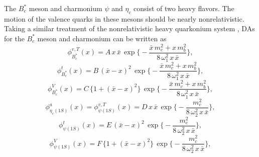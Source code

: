 \documentclass[preprint,superscriptaddress,nofootinbib]{revtex4}
\begin{document}
  The $B_{c}^{\ast}$ meson and charmonium ${\psi}$ and ${\eta}_{c}$
  consist of two heavy flavors.
  The motion of the valence quarks in these mesons should be nearly
  nonrelativistic.
  Taking a similar treatment of the nonrelativistic heavy quarkonium system
  \cite{plb751.171,plb752.322,ijmpa31.1650146,npb911.890},
  DAs for the $B_{c}^{\ast}$ meson and charmonium can be written as
   \begin{equation}
  {\phi}_{B_{c}^{\ast}}^{v,T}(x) = A\, x\,\bar{x}\,
  {\exp}\Big\{ -\frac{\bar{x}\,m_{c}^{2}+x\,m_{b}^{2}}
                     {8\,{\omega}_{1}^{2}\,x\,\bar{x}} \Big\}
   \label{da-bc-ev},
   \end{equation}
   \begin{equation}
  {\phi}_{B_{c}^{\ast}}^{t}(x) = B\, (\bar{x}-x)^{2}\,
  {\exp}\Big\{ -\frac{\bar{x}\,m_{c}^{2}+x\,m_{b}^{2}}
                     {8\,{\omega}_{1}^{2}\,x\,\bar{x}} \Big\}
   \label{da-bc-et},
   \end{equation}
   \begin{equation}
  {\phi}_{B_{c}^{\ast}}^{V}(x) = C\, \big\{ 1+(\bar{x}-x)^{2} \big\}\,
  {\exp}\Big\{ -\frac{\bar{x}\,m_{c}^{2}+x\,m_{b}^{2}}
                     {8\,{\omega}_{1}^{2}\,x\,\bar{x}} \Big\}
   \label{da-bc-tv},
   \end{equation}
   \begin{equation}
  {\phi}_{{\eta}_{c}(1S)}^{a}(x) =
  {\phi}_{{\psi}(1S)}^{v,T}(x) = D\, x\,\bar{x}\,
  {\exp}\Big\{ -\frac{ m_{c}^{2} }{ 8\,{\omega}_{2}^{2}\,x\,\bar{x} } \Big\}
   \label{da-j-ev},
   \end{equation}
   \begin{equation}
  {\phi}_{{\psi}(1S)}^{t}(x) = E\, (\bar{x}-x)^{2}\,
  {\exp}\Big\{ -\frac{ m_{c}^{2} }{ 8\,{\omega}_{2}^{2}\,x\,\bar{x} } \Big\}
   \label{da-j-et},
   \end{equation}
   \begin{equation}
  {\phi}_{{\psi}(1S)}^{V}(x) = F\, \big\{ 1+(\bar{x}-x)^{2} \big\}\,
  {\exp}\Big\{ -\frac{ m_{c}^{2} }{ 8\,{\omega}_{2}^{2}\,x\,\bar{x} } \Big\}
   \label{da-j-tv},
   \end{equation}
\end{document}
